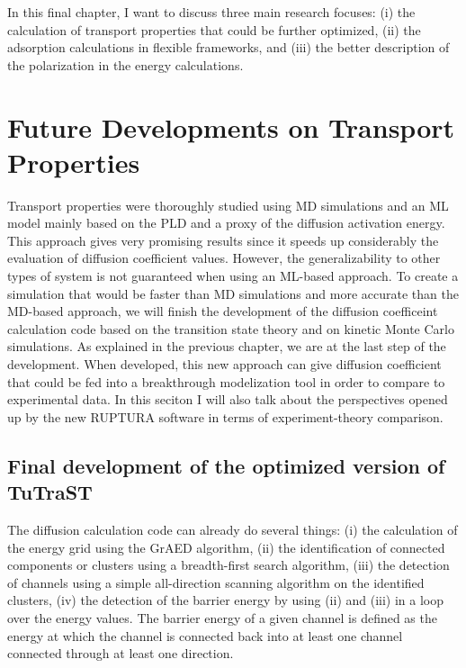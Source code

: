 \documentclass[main]{subfiles}
\begin{document}
In this final chapter, I want to discuss three main research focuses: (i) the calculation of transport properties that could be further optimized, (ii) the adsorption calculations in flexible frameworks, and (iii) the better description of the polarization in the energy calculations.

\section{Future Developments on Transport Properties}

Transport properties were thoroughly studied using MD simulations and an ML model mainly based on the PLD and a proxy of the diffusion activation energy. This approach gives very promising results since it speeds up considerably the evaluation of diffusion coefficient values. However, the generalizability to other types of system is not guaranteed when using an ML-based approach. To create a simulation that would be faster than MD simulations and more accurate than the MD-based approach, we will finish the development of the diffusion coefficeint calculation code based on the transition state theory and on kinetic Monte Carlo simulations. As explained in the previous chapter, we are at the last step of the development. When developed, this new approach can give diffusion coefficient that could be fed into a breakthrough modelization tool in order to compare to experimental data. In this seciton I will also talk about the perspectives opened up by the new RUPTURA software in terms of experiment-theory comparison.

\subsection{Final development of the optimized version of TuTraST}

The diffusion calculation code can already do several things: (i) the calculation of the energy grid using the GrAED algorithm, (ii) the identification of connected components or clusters using a breadth-first search algorithm, (iii)
the detection of channels using a simple all-direction scanning algorithm on the identified clusters, (iv) the detection of the barrier energy by using (ii) and (iii) in a loop over the energy values. The barrier energy of a given channel is defined as the energy at which the channel is connected back into at least one channel connected through at least one direction. 
\end{document}
